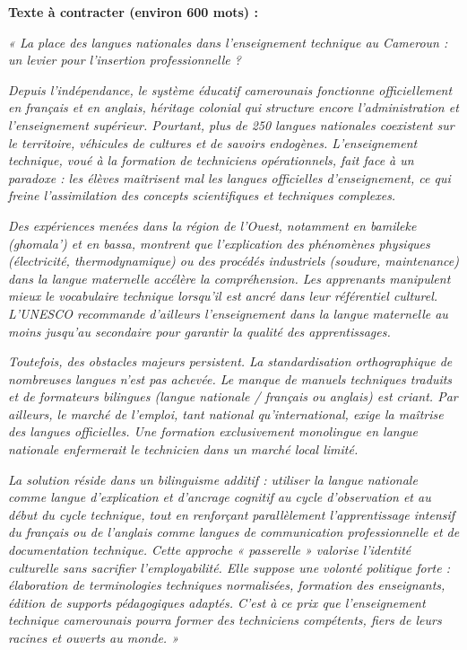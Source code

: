 \documentclass[11pt]{article}
\begin{document}
\begin{exercice}
\textbf{Texte à contracter (environ 600 mots) :}

\emph{« La place des langues nationales dans l'enseignement technique au Cameroun : un levier pour l'insertion professionnelle ?}

\emph{Depuis l'indépendance, le système éducatif camerounais fonctionne officiellement en français et en anglais, héritage colonial qui structure encore l'administration et l'enseignement supérieur. Pourtant, plus de 250 langues nationales coexistent sur le territoire, véhicules de cultures et de savoirs endogènes. L'enseignement technique, voué à la formation de techniciens opérationnels, fait face à un paradoxe : les élèves maîtrisent mal les langues officielles d'enseignement, ce qui freine l'assimilation des concepts scientifiques et techniques complexes.}

\emph{Des expériences menées dans la région de l'Ouest, notamment en bamileke (ghomala') et en bassa, montrent que l'explication des phénomènes physiques (électricité, thermodynamique) ou des procédés industriels (soudure, maintenance) dans la langue maternelle accélère la compréhension. Les apprenants manipulent mieux le vocabulaire technique lorsqu'il est ancré dans leur référentiel culturel. L'UNESCO recommande d'ailleurs l'enseignement dans la langue maternelle au moins jusqu'au secondaire pour garantir la qualité des apprentissages.}

\emph{Toutefois, des obstacles majeurs persistent. La standardisation orthographique de nombreuses langues n'est pas achevée. Le manque de manuels techniques traduits et de formateurs bilingues (langue nationale / français ou anglais) est criant. Par ailleurs, le marché de l'emploi, tant national qu'international, exige la maîtrise des langues officielles. Une formation exclusivement monolingue en langue nationale enfermerait le technicien dans un marché local limité.}

\emph{La solution réside dans un bilinguisme additif : utiliser la langue nationale comme langue d'explication et d'ancrage cognitif au cycle d'observation et au début du cycle technique, tout en renforçant parallèlement l'apprentissage intensif du français ou de l'anglais comme langues de communication professionnelle et de documentation technique. Cette approche « passerelle » valorise l'identité culturelle sans sacrifier l'employabilité. Elle suppose une volonté politique forte : élaboration de terminologies techniques normalisées, formation des enseignants, édition de supports pédagogiques adaptés. C'est à ce prix que l'enseignement technique camerounais pourra former des techniciens compétents, fiers de leurs racines et ouverts au monde. »}


\end{exercice}
\end{document}
